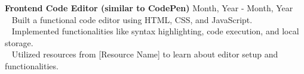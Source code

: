 {\textbf{Frontend Code Editor (similar to CodePen)}} \hfill {Month, Year - Month, Year} \\
\hspace*{4pt} \textbullet~ Built a functional code editor using HTML, CSS, and JavaScript.\\
\hspace*{4pt} \textbullet~ Implemented functionalities like syntax highlighting, code execution, and local storage.\\
\hspace*{4pt} \textbullet~ Utilized resources from [Resource Name] to learn about editor setup and functionalities.\\[4pt]

